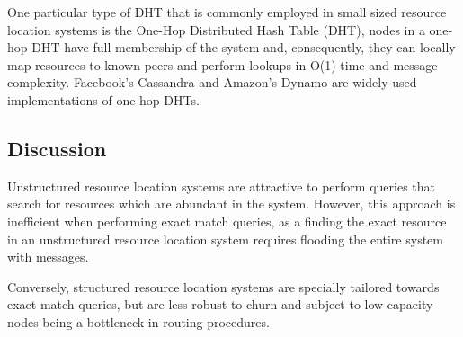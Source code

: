 One particular type of DHT that is commonly employed in small sized resource location systems is the One-Hop Distributed Hash Table (DHT), nodes in a one-hop DHT have full membership of the system and, consequently, they can locally map resources to known peers and perform lookups in O(1) time and message complexity. Facebook's Cassandra \cite{lakshman2010cassandra} and Amazon's Dynamo \cite{decandia2007dynamo} are widely used implementations of one-hop DHTs. 


\subsection{Discussion}

Unstructured resource location systems are attractive to perform queries that search for resources which are abundant in the system. However, this approach is inefficient when performing exact match queries, as a finding the exact resource in an unstructured resource location system requires flooding the entire system with messages.

Conversely, structured resource location systems are specially tailored towards exact match queries, but are less robust to churn and subject to low-capacity nodes being a bottleneck in routing procedures.   







